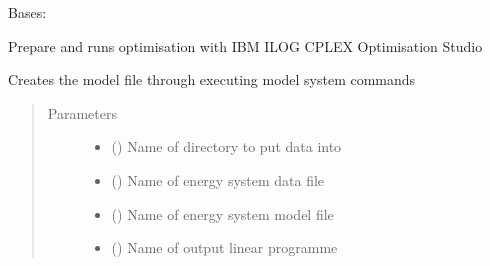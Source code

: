 \documentclass[a4paper,12pt,english]{article}
\begin{document}
\begin{fulllineitems}
\label{\detokenize{GOCPI:GOCPI.Optimisation.Optimisation}}
Bases: 

Prepare and runs optimisation with IBM ILOG CPLEX Optimisation Studio

\begin{fulllineitems}
\label{\detokenize{GOCPI:GOCPI.Optimisation.Optimisation.create_linear_programme_file}}
Creates the model file through executing model system commands
\begin{quote}\begin{description}
\item[{Parameters}] \leavevmode\begin{itemize}
\item {} 
 () \textendash{} Name of directory to put data into

\item {} 
 () \textendash{} Name of energy system data file

\item {} 
 () \textendash{} Name of energy system model file

\item {} 
 () \textendash{} Name of output linear programme

\end{itemize}

\end{description}\end{quote}

\end{fulllineitems}


\end{fulllineitems}
\end{document}
